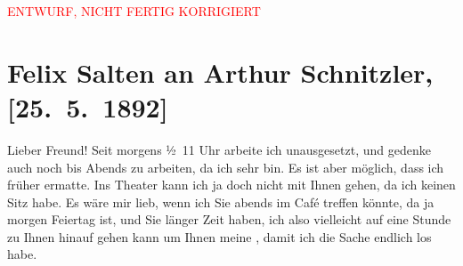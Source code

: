
\begin{center}
            \textcolor{red}{ENTWURF, NICHT FERTIG KORRIGIERT}
                      \end{center}
            
         
         \renewcommand{\erwaehntePersonen}{Personen: Leopold Weiss}
         \renewcommand{\erwaehnteOrte}{Orte: Wien}
         \renewcommand{\erwaehnteWerke}{Werke: Anatol, Muza}
               \section[Felix Salten an Arthur Schnitzler, {[}25. 5. 1892{]}]{ Felix Salten an Arthur Schnitzler, {[}25. 5. 1892{]}}\nopagebreak{}\rehead{ }\begin{ledgroupsized}[t]{13cm}\normalsize\beginnumbering \toendnotes[C]{\smallbreak\pagebreak[2]} 
\toendnotes[C]{\smallbreak}\pstart
           \noindent{}{\pb}Lieber Freund! Seit morgens ½ 11 Uhr arbeite ich
               unausgesetzt, und gedenke auch noch bis Abends zu arbeiten, da ich sehr \label{K_L03109-1v}\label{K_L03109-1h}
               bin. Es ist aber möglich, dass ich früher ermatte. \pend
           \pstart
           Ins Theater kann ich ja doch nicht mit Ihnen gehen, da ich keinen Sitz habe. Es wäre
               mir lieb, wenn ich Sie abends im Café {\pb}treffen könnte, da \strikeout{\textcolor{gray}{au}} ja morgen Feiertag ist, und Sie länger Zeit haben, ich also vielleicht auf
               eine Stunde zu Ihnen hinauf gehen kann um Ihnen meine \label{K_L03109-2v}\label{K_L03109-2h}, damit ich die Sache endlich los habe. \pend
           \pstart

\end{ledgroupsized}
